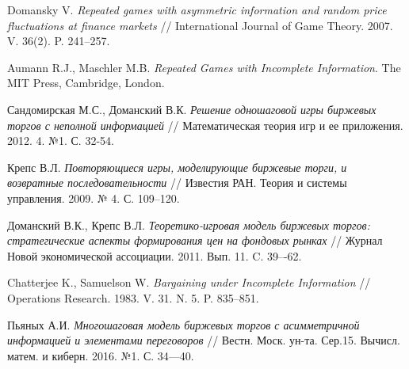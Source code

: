 \documentclass[12pt, draft]{extarticle}
\begin{document}
\begin{thebibliography}{99}

%
  Domansky V. \emph{Repeated games with asymmetric information and random price
    fluctuations at finance markets} // International Journal of Game Theory.
  2007. V. 36(2). P. 241--257.

%
  Aumann R.J., Maschler M.B. \emph{Repeated Games with Incomplete Information}.
  The MIT Press, Cambridge, London.

%
  Сандомирская М.С., Доманский В.К. \emph{Решение одношаговой игры биржевых
    торгов с неполной информацией} // Математическая теория игр и ее приложения.
  2012. 4. №1. С. 32-54.

%
  Крепс В.Л. \emph{Повторяющиеся игры, моделирующие биржевые торги, и возвратные
    последовательности} // Известия РАН. Теория и системы управления. 2009. № 4.
  С. 109--120.

%
  Доманский В.К., Крепс В.Л. \emph{Теоретико-игровая модель биржевых торгов:
    стратегические аспекты формирования цен на фондовых рынках} // Журнал Новой
  экономической ассоциации. 2011. Вып. 11. C. 39–-62.

%
  Chatterjee K., Samuelson W. \emph{Bargaining under Incomplete Information} //
  Operations Research. 1983. V. 31. N. 5. P. 835--851.


%
  Пьяных А.И. \textit{Многошаговая модель биржевых торгов с асимметричной
    информацией и элементами переговоров} // Вестн. Моск. ун-та. Сер.15. Вычисл.
  матем. и киберн. 2016. №1. С. 34—40.
\end{thebibliography}
\end{document}
